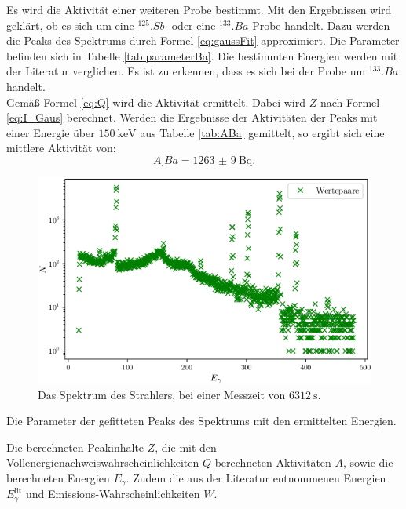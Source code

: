 Es wird die Aktivität einer weiteren Probe bestimmt. Mit den Ergebnissen wird geklärt, ob es sich um eine $^{125}.{Sb}$- oder eine $^{133}.{Ba}$-Probe handelt.
Dazu werden die Peaks des Spektrums durch Formel \eqref{eq:gaussFit} approximiert. Die Parameter befinden sich in Tabelle \ref{tab:parameterBa}. Die bestimmten Energien werden mit der Literatur \cite{KHAZOV2011855} verglichen. Es ist zu erkennen, dass es sich bei der Probe um $^{133}.{Ba}$ handelt.\\
Gemäß Formel \eqref{eq:Q} wird die Aktivität ermittelt. Dabei wird $Z$ nach Formel \eqref{eq:I_Gaus} berechnet. Werden die Ergebnisse der Aktivitäten der Peaks mit einer Energie über $\SI{150}{\kilo\electronvolt}$ aus Tabelle \ref{tab:ABa} gemittelt, so ergibt sich eine mittlere Aktivität von:
\[
A_.{Ba} = \SI{1263(9)}{\becquerel}\text{.}
\]

\begin{figure}
	\centering
	\includegraphics[width=\linewidth-70pt,height=\textheight-70pt,keepaspectratio]{content/images/D.png}
	\caption{Das Spektrum des Strahlers, bei einer Messzeit von $\SI{6312}{\second}$.}
	\label{fig:Ba}
\end{figure}

\begin{table}
	\centering
	\caption{Die Parameter der gefitteten Peaks des Spektrums mit den ermittelten Energien.}
	
	\label{tab:parameterBa}
\end{table}

\begin{table}
	\centering
	\caption{Die berechneten Peakinhalte $Z$, die mit den Vollenergienachweiswahrscheinlichkeiten $Q$ berechneten Aktivitäten $A$,  sowie die berechneten Energien $E_\gamma$.  Zudem die aus der Literatur entnommenen Energien $E_\gamma^\text{lit}$ und Emissions-Wahrscheinlichkeiten $W$.}
	
	\label{tab:ABa}
\end{table}

